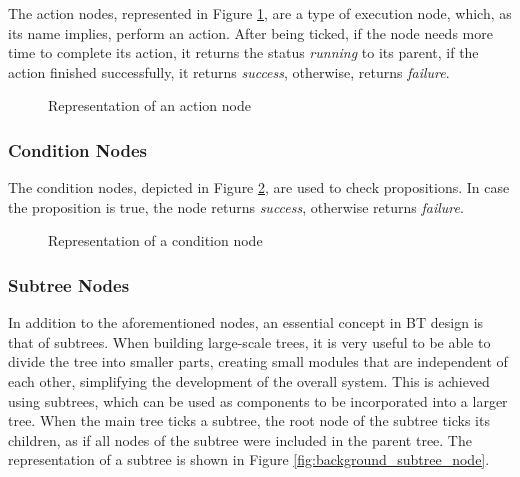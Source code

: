 The action nodes, represented in Figure \ref{fig:background_action_node}, are a type of execution node, which, as its name implies, perform an action. After being ticked, if the node needs more time to complete its action, it returns the status \textit{running} to its parent, if the action finished successfully, it returns \textit{success}, otherwise, returns \textit{failure}.

\begin{figure}[!h]
    \centering
    \scalebox{.9} {
        \begin{forest}
        \end{forest}
    }
    \caption{Representation of an action node}
    \label{fig:background_action_node}
\end{figure}

\subsubsection{Condition Nodes}

The condition nodes, depicted in Figure \ref{fig:background_condition_node}, are used to check propositions. In case the proposition is true, the node returns \textit{success}, otherwise returns \textit{failure}.

\begin{figure}[!h]
    \centering
    \scalebox{.9} {
        \begin{forest}
        \end{forest}
    }
    \caption{Representation of a condition node}
    \label{fig:background_condition_node}
\end{figure}

\subsubsection{Subtree Nodes}

In addition to the aforementioned nodes, an essential concept in BT design is that of subtrees. When building large-scale trees, it is very useful to be able to divide the tree into smaller parts, creating small modules that are independent of each other, simplifying the development of the overall system. This is achieved using subtrees, which can be used as components to be incorporated into a larger tree. When the main tree ticks a subtree, the root node of the subtree ticks its children, as if all nodes of the subtree were included in the parent tree. The representation of a subtree is shown in Figure \ref{fig:background_subtree_node}.

